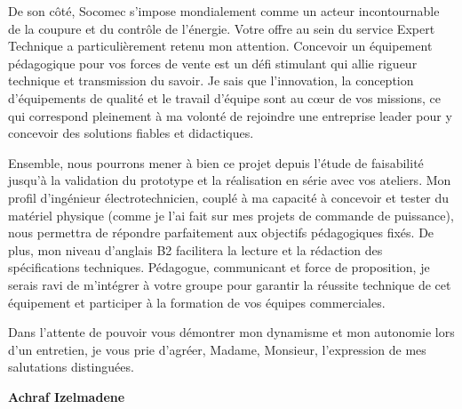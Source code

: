 \documentclass[10pt,a4paper]{altacv}
\begin{document}
\vspace{0.4cm}

De son côté, Socomec s'impose mondialement comme un acteur incontournable de la coupure et du contrôle de l'énergie. Votre offre au sein du service Expert Technique a particulièrement retenu mon attention. Concevoir un équipement pédagogique pour vos forces de vente est un défi stimulant qui allie rigueur technique et transmission du savoir. Je sais que l'innovation, la conception d'équipements de qualité et le travail d'équipe sont au cœur de vos missions, ce qui correspond pleinement à ma volonté de rejoindre une entreprise leader pour y concevoir des solutions fiables et didactiques.

\vspace{0.4cm}

Ensemble, nous pourrons mener à bien ce projet depuis l'étude de faisabilité jusqu'à la validation du prototype et la réalisation en série avec vos ateliers. Mon profil d'ingénieur électrotechnicien, couplé à ma capacité à concevoir et tester du matériel physique (comme je l'ai fait sur mes projets de commande de puissance), nous permettra de répondre parfaitement aux objectifs pédagogiques fixés. De plus, mon niveau d'anglais B2 facilitera la lecture et la rédaction des spécifications techniques. Pédagogue, communicant et force de proposition, je serais ravi de m'intégrer à votre groupe pour garantir la réussite technique de cet équipement et participer à la formation de vos équipes commerciales.

\vspace{0.4cm}

Dans l'attente de pouvoir vous démontrer mon dynamisme et mon autonomie lors d'un entretien, je vous prie d'agréer, Madame, Monsieur, l'expression de mes salutations distinguées.

\vspace{0.5cm}

\vfill

\begin{flushright}
  \Large\color{emphasis}\textbf{Achraf Izelmadene}
\end{flushright}
\end{document}
